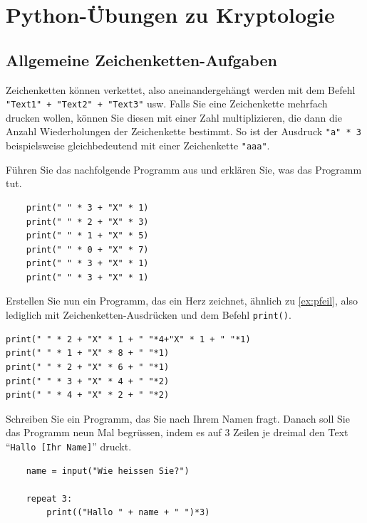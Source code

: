 \chapter{Python-Übungen zu Kryptologie}\label{ch:Kryptologie}

\section{Allgemeine Zeichenketten-Aufgaben}
Zeichenketten können verkettet, also aneinandergehängt werden mit dem Befehl \lstinline|"Text1" + "Text2" + "Text3"| usw. Falls Sie eine Zeichenkette mehrfach drucken wollen, können Sie diesen mit einer Zahl multiplizieren, die dann die Anzahl Wiederholungen der Zeichenkette bestimmt. So ist der Ausdruck \lstinline|"a" * 3| beispielsweise gleichbedeutend mit einer Zeichenkette \lstinline|"aaa"|.

\begin{myexercise}\label{ex:pfeil}
	Führen Sie das nachfolgende Programm aus und erklären Sie, was das Programm tut.
	\begin{lstlisting}
    print(" " * 3 + "X" * 1)
    print(" " * 2 + "X" * 3)
    print(" " * 1 + "X" * 5)
    print(" " * 0 + "X" * 7)
    print(" " * 3 + "X" * 1)
    print(" " * 3 + "X" * 1)
  \end{lstlisting}
\end{myexercise}


\begin{myexercise}
	Erstellen Sie nun ein Programm, das ein Herz zeichnet, ähnlich zu \cref{ex:pfeil}, also lediglich mit Zeichenketten-Ausdrücken und dem Befehl \lstinline|print()|.
	\begin{myanswer}
		\begin{lstlisting}
print(" " * 2 + "X" * 1 + " "*4+"X" * 1 + " "*1)
print(" " * 1 + "X" * 8 + " "*1)
print(" " * 2 + "X" * 6 + " "*1)
print(" " * 3 + "X" * 4 + " "*2)
print(" " * 4 + "X" * 2 + " "*2)
\end{lstlisting}
	\end{myanswer}
\end{myexercise}

\begin{myexercise}\label{ex:name}
	Schreiben Sie ein Programm, das Sie nach Ihrem Namen fragt. Danach soll Sie das Programm neun Mal begrüssen, indem es auf 3 Zeilen je dreimal den Text ``\texttt{Hallo [Ihr Name]}'' druckt.
	\begin{myanswer}
		\begin{lstlisting}
	name = input("Wie heissen Sie?")
	
	repeat 3:
	    print(("Hallo " + name + " ")*3)
  \end{lstlisting}
	\end{myanswer}
\end{myexercise}

